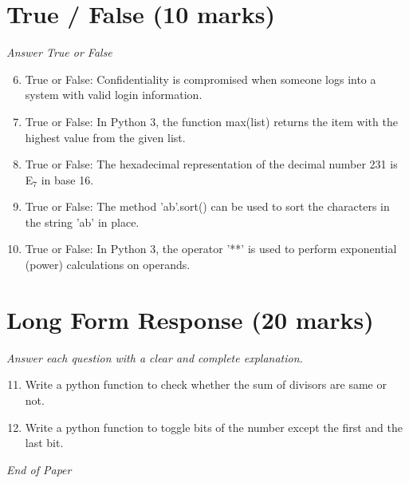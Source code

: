 \documentclass[12pt]{article}
\begin{document}
\section*{True / False (10 marks)}
\textit{Answer True or False}
\begin{enumerate}[label=\arabic*.]
\setcounter{enumi}{5}
\item True or False: Confidentiality is compromised when someone logs into a system with valid login information.
\item True or False: In Python 3, the function max(list) returns the item with the highest value from the given list.
\item True or False: The hexadecimal representation of the decimal number 231 is E$_{7}$ in base 16.
\item True or False: The method 'ab'.sort() can be used to sort the characters in the string 'ab' in place.
\item True or False: In Python 3, the operator '**' is used to perform exponential (power) calculations on operands.
\end{enumerate}

\section*{Long Form Response (20 marks)}
\textit{Answer each question with a clear and complete explanation.}
\begin{enumerate}[label=\arabic*.]
\setcounter{enumi}{10}
\item Write a python function to check whether the sum of divisors are same or not.
\item Write a python function to toggle bits of the number except the first and the last bit.
\end{enumerate}

\vfill
\noindent\textit{End of Paper}
\end{document}
